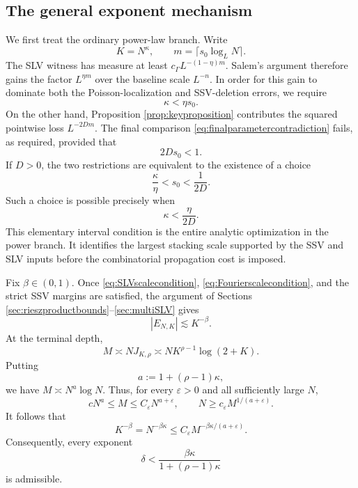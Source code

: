 \documentclass[12pt]{amsart}
\numberwithin{equation}{section}
\begin{document}
\subsection{The general exponent mechanism}

We first treat the ordinary power-law branch.  Write
\[
 K=N^\kappa,
 \qquad
 m=\lceil s_0\log_LN\rceil.
\]
The SLV witness has measure at least
$c_\Gamma L^{-(1-\eta)m}$.  Salem's argument therefore gains the factor
$L^{\eta m}$ over the baseline scale $L^{-n}$.  In order for this gain to
dominate both the Poisson-localization and SSV-deletion errors, we require
\begin{equation}\label{eq:SLVscalecondition}
 \kappa<\eta s_0.
\end{equation}
On the other hand, Proposition \ref{prop:keyproposition} contributes the
squared pointwise loss $L^{-2Dm}$.  The final comparison
\eqref{eq:finalparametercontradiction} fails, as required, provided that
\begin{equation}\label{eq:Fourierscalecondition}
 2Ds_0<1.
\end{equation}
If $D>0$, the two restrictions are equivalent to the existence of a choice
\[
 \frac{\kappa}{\eta}<s_0<\frac1{2D}.
\]
Such a choice is possible precisely when
\begin{equation}\label{eq:optimizedkappa}
 \kappa<\frac{\eta}{2D}.
\end{equation}
This elementary interval condition is the entire analytic optimization in the
power branch.  It identifies the largest stacking scale supported by the SSV
and SLV inputs before the combinatorial propagation cost is imposed.

Fix $\beta\in(0,1)$.  Once \eqref{eq:SLVscalecondition},
\eqref{eq:Fourierscalecondition}, and the strict SSV margins are satisfied,
the argument of Sections \ref{sec:rieszproductbounds}--\ref{sec:multiSLV}
gives
\[
 |E_{N,K}|\lesssim K^{-\beta}.
\]
At the terminal depth,
\[
 M\asymp NJ_{K,\rho}
 \asymp NK^{\rho-1}\log(2+K).
\]
Putting
\[
 a:=1+(\rho-1)\kappa,
\]
we have $M\asymp N^a\log N$.  Thus, for every $\varepsilon>0$ and all
sufficiently large $N$,
\[
 cN^a\leq M\leq C_\varepsilon N^{a+\varepsilon},
 \qquad
 N\geq c_\varepsilon M^{1/(a+\varepsilon)}.
\]
It follows that
\begin{equation}\label{eq:propagated-power-calculation}
 K^{-\beta}=N^{-\beta\kappa}
 \leq C_\varepsilon
 M^{-\beta\kappa/(a+\varepsilon)}.
\end{equation}
Consequently, every exponent
\begin{equation}\label{eq:generalpropagatedexponent}
 \delta<\frac{\beta\kappa}{1+(\rho-1)\kappa}
\end{equation}
is admissible.  
\end{document}
